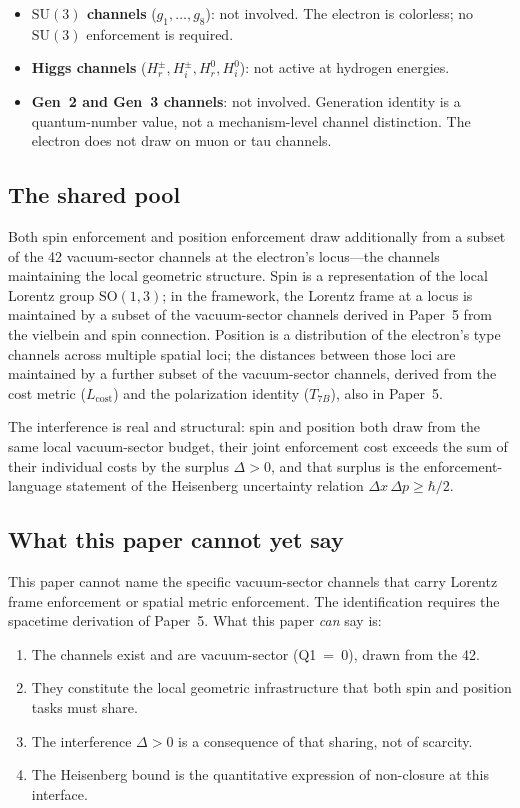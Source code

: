 \documentclass[11pt]{article}
\newenvironment{varlist}{\begin{itemize}[nosep,leftmargin=2em]}{\end{itemize}}
\newcommand{\SU}{\mathrm{SU}}
\begin{document}
\begin{varlist}
\item \textbf{$\SU(3)$ channels} ($g_1,\ldots,g_8$): not involved.  The
electron is colorless; no $\SU(3)$ enforcement is required.
\item \textbf{Higgs channels} ($H^\pm_r, H^\pm_i, H^0_r, H^0_i$): not
active at hydrogen energies.
\item \textbf{Gen~2 and Gen~3 channels}: not involved.  Generation
identity is a quantum-number value, not a mechanism-level channel
distinction.  The electron does not draw on muon or tau channels.
\end{varlist}

\subsection*{The shared pool}

Both spin enforcement and position enforcement draw additionally from a
subset of the 42 vacuum-sector channels at the electron's
locus---the channels maintaining the local geometric structure.  Spin is
a representation of the local Lorentz group $\mathrm{SO}(1,3)$; in the
framework, the Lorentz frame at a locus is maintained by a subset of the
vacuum-sector channels derived in Paper~5 from the vielbein and spin
connection.  Position is a distribution of the electron's type channels
across multiple spatial loci; the distances between those loci are
maintained by a further subset of the vacuum-sector channels, derived
from the cost metric ($L_{\mathrm{cost}}$) and the polarization identity
($T_{7B}$), also in Paper~5.

The interference is real and structural: spin and position both draw from
the same local vacuum-sector budget, their joint enforcement cost exceeds
the sum of their individual costs by the surplus $\Delta > 0$, and that
surplus is the enforcement-language statement of the Heisenberg
uncertainty relation $\Delta x\,\Delta p \ge \hbar/2$.

\subsection*{What this paper cannot yet say}

This paper cannot name the specific vacuum-sector channels that carry
Lorentz frame enforcement or spatial metric enforcement.  The
identification requires the spacetime derivation of Paper~5.  What this
paper \emph{can} say is:

\begin{enumerate}
\item The channels exist and are vacuum-sector (Q1~=~0), drawn from the
42.
\item They constitute the local geometric infrastructure that both spin
and position tasks must share.
\item The interference $\Delta > 0$ is a consequence of that sharing,
not of scarcity.
\item The Heisenberg bound is the quantitative expression of
non-closure at this interface.
\end{enumerate}
\end{document}
